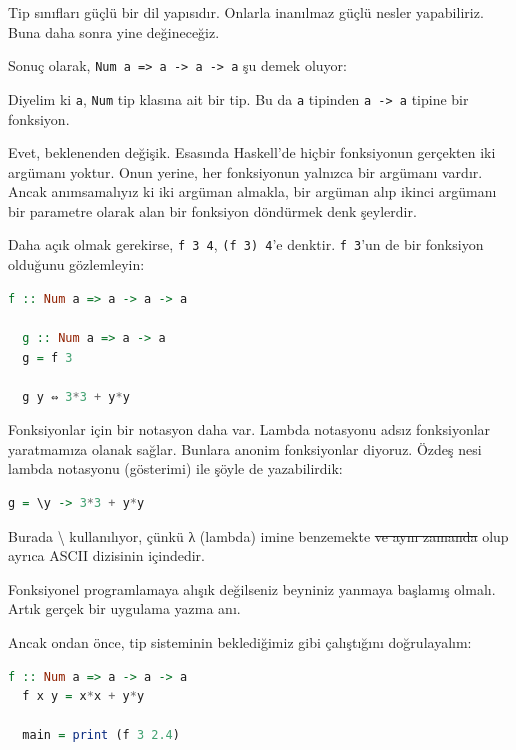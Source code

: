 \documentclass[a4paper,14pt,openany]{extbook} %
\begin{document}
Tip sınıfları güçlü bir dil yapısıdır. Onlarla inanılmaz güçlü nesler
yapabiliriz. Buna daha sonra yine değineceğiz.

Sonuç olarak, \lstinline!Num a => a -> a -> a! şu demek oluyor:

Diyelim ki \lstinline!a!, \lstinline!Num! tip klasına ait bir tip. Bu
da \lstinline!a! tipinden \lstinline!a -> a! tipine bir fonksiyon.

Evet, beklenenden değişik. Esasında Haskell'de hiçbir fonksiyonun gerçekten iki
argümanı yoktur. Onun yerine, her fonksiyonun yalnızca bir argümanı
vardır. Ancak anımsamalıyız ki iki argüman almakla, bir argüman alıp
ikinci argümanı bir parametre olarak alan bir fonksiyon döndürmek denk
şeylerdir.

Daha açık olmak gerekirse, \lstinline!f 3 4!, \lstinline!(f 3) 4!'e
denktir. \lstinline!f 3!'un de bir fonksiyon olduğunu gözlemleyin:

\begin{lstlisting}[language=Haskell]
  f :: Num a => a -> a -> a

  g :: Num a => a -> a
  g = f 3

  g y ⇔ 3*3 + y*y
\end{lstlisting}

Fonksiyonlar için bir notasyon daha var. Lambda notasyonu adsız
fonksiyonlar yaratmamıza olanak sağlar. Bunlara anonim fonksiyonlar
diyoruz. Özdeş nesi lambda notasyonu (gösterimi) ile şöyle de yazabilirdik:

\begin{lstlisting}[language=Haskell]
  g = \y -> 3*3 + y*y
\end{lstlisting}

Burada \textbackslash{} kullanılıyor, çünkü λ (lambda) imine
benzemekte \st{ve aynı zamanda} olup %
ayrıca ASCII dizisinin içindedir.

Fonksiyonel programlamaya alışık değilseniz beyniniz yanmaya
başlamış olmalı. Artık gerçek bir uygulama yazma anı.

Ancak ondan önce, tip sisteminin beklediğimiz gibi çalıştığını
doğrulayalım:

\begin{lstlisting}[language=Haskell]
  f :: Num a => a -> a -> a
  f x y = x*x + y*y

  main = print (f 3 2.4)
\end{lstlisting}
\end{document}
